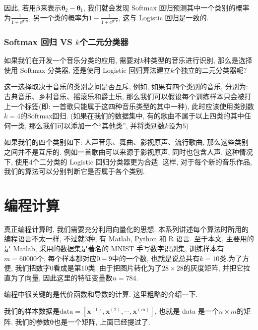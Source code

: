 \documentclass[a4paper,UTF8]{ctexart}
\theoremstyle{plain} \newtheorem{theorem}{定理}[section]
\theoremstyle{plain} \newtheorem{definition}{定义}[section]
\theoremstyle{plain} \newtheorem{lemma}{引理}[section]
\theoremstyle{plain} \newtheorem{proposition}{命题}[section]
\theoremstyle{plain} \newtheorem{example}{例}[section]
\theoremstyle{plain} \newtheorem{remark}{注}[section]
\theoremstyle{plain} \newtheorem{corollary}{推论}[section]
\begin{document}
因此, 若用$\bm{\beta}$来表示$\bm{\theta}_{2} - \bm{\theta}_{1}$, 我们就会发现 Softmax 回归预测其中一个类别的概率为$\frac{1}{1 + e^{\bm{\beta}^{T} \bm{x} }}$, 另一个类的概率为$1 - \frac{1}{1 + e^{\bm{\beta}^{T} \bm{x} }}$, 这与 Logistic 回归是一致的.


\subsubsection{Softmax 回归 VS $k$个二元分类器}
如果我们在开发一个音乐分类的应用, 需要对$k$种类型的音乐进行识别, 那么是选择使用 Softmax 分类器, 还是使用 Logistic 回归算法建立$k$个独立的二元分类器呢?

这一选择取决于音乐的类别之间是否互斥, 例如, 如果有四个类别的音乐, 分别为: 古典音乐、乡村音乐、摇滚乐和爵士乐, 那么我们可以假设每个训练样本只会被打上一个标签(即: 一首歌只能属于这四种音乐类型的其中一种), 此时应该使用类别数$k=4$的Softmax回归. (如果在我们的数据集中, 有的歌曲不属于以上四类的其中任何一类, 那么我们可以添加一个“其他类”, 并将类别数$k$设为$5$)

如果我们的四个类别如下: 人声音乐、舞曲、影视原声、流行歌曲, 那么这些类别之间并不是互斥的. 例如一首歌曲可以来源于影视原声, 同时也包含人声. 这种情况下, 使用$4$个二分类的 Logistic 回归分类器更为合适. 这样, 对于每个新的音乐作品, 我们的算法可以分别判断它是否属于各个类别.



\section{编程计算}
真正编程计算时, 我们需要充分利用向量化的思想. 本系列讲述每个算法时所用的编程语言不太一样, 不过就$3$种, 有 Matlab, Python 和 R 语言. 至于本文, 主要用的是 Matlab, 采用的数据集是著名的 MNIST 手写数字识别集, 训练样本有$m=60000$个, 每个样本都对应$0-9$中的一个数, 也就是说总共有$k=10$类.为了方便, 我们把数字$0$看成是第$10$类. 由于把图片转化为了$28 \times 28$的灰度矩阵, 并把它拉直为了向量, 因此这里的特征变量数$n=784$.

编程中很关键的是代价函数和导数的计算. 这里粗略的介绍一下.

我们的样本数据是$\mathrm{data} = [\bm{x}^{(1)}, \bm{x}^{(2)}, \cdots, \bm{x}^{(m)}]$, 也就是 data 是一个$n \times m$的矩阵. 我们的参数$\bm{\theta}$也是一个矩阵, 上面已经提过了.
\end{document}

